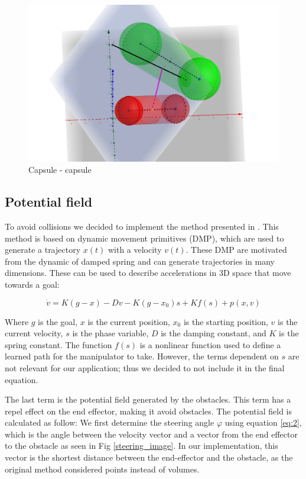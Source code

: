 \documentclass[a4paper, 10pt, conference]{ieeeconf}      %
\begin{document}
\begin{figure}[H]
    \centering
    \includegraphics[scale=0.15]{images/capsule-capsule.png}
    \caption{Capsule - capsule}
    \label{fig:capsule_capsule}
\end{figure}


\subsection{Potential field} %

To avoid collisions we decided to implement the method presented in \cite{1}. This method is based on dynamic movement primitives (DMP), which are used to generate a trajectory $x(t)$ with a velocity $v(t)$. These DMP are motivated from the dynamic of damped spring and can generate trajectories in many dimensions. These can be used to describe accelerations in 3D space that move towards a goal:

\begin{equation} \label{eq:1}
	\dot{v} = K ( g - x ) - D v - K (g - x_0) s + K f(s) + p(x, v)
\end{equation}

Where $g$ is the goal, $x$ is the current position, $x_0$ is the starting position, $v$ is the current velocity, $s$ is the phase variable, $D$ is the damping constant, and $K$ is the spring constant. The function $f(s)$ is a nonlinear function used to define a learned path for the manipulator to take. However, the terms dependent on $s$ are not relevant for our application; thus we decided to not include it in the final equation.  

The last term is the potential field generated by the obstacles. This term has a repel effect on the end effector, making it avoid obstacles. The potential field is calculated as follow: We first determine the steering angle $\varphi$ using equation \ref{eq:2}, which is the angle between the velocity vector and a vector from the end effector to the obstacle as seen in Fig \ref{steering_image}. In our implementation, this vector is the shortest distance between the end-effector and the obstacle, as the original method considered points instead of volumes.
\end{document}
